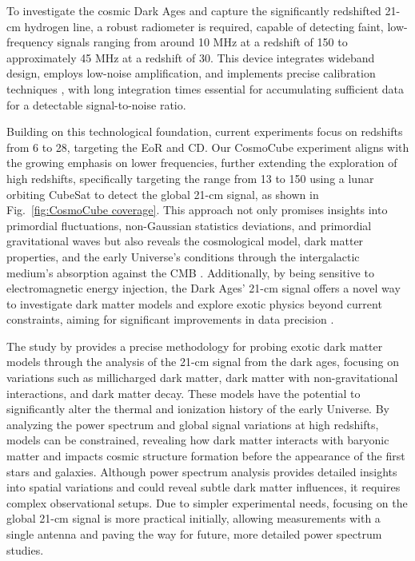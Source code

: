 \documentclass[fleqn,usenatbib]{rasti}
\begin{document}
To investigate the cosmic Dark Ages and capture the significantly redshifted 21-cm hydrogen line, a robust radiometer is required, capable of detecting faint, low-frequency signals ranging from around 10 MHz at a redshift of 150 to approximately 45 MHz at a redshift of 30. This device integrates wideband design, employs low-noise amplification, and implements precise calibration techniques \citep{Rogers2008}, with long integration times essential for accumulating sufficient data for a detectable signal-to-noise ratio. 

Building on this technological foundation, current experiments focus on redshifts from 6 to 28, targeting the EoR and CD. Our CosmoCube experiment aligns with the growing emphasis on lower frequencies, further extending the exploration of high redshifts, specifically targeting the range from 13 to 150 using a lunar orbiting CubeSat to detect the global 21-cm signal, as shown in Fig.~\ref{fig:CosmoCube coverage}. This approach not only promises insights into primordial fluctuations, non-Gaussian statistics deviations, and primordial gravitational waves but also reveals the cosmological model, dark matter properties, and the early Universe's conditions through the intergalactic medium's absorption against the CMB \citep{Pritchard2012}. Additionally, by being sensitive to electromagnetic energy injection, the Dark Ages' 21-cm signal offers a novel way to investigate dark matter models and explore exotic physics beyond current constraints, aiming for significant improvements in data precision \cite{Koopmans2021}.

The study by \cite{Mondal2023} provides a precise methodology for probing exotic dark matter models through the analysis of the 21-cm signal from the dark ages, focusing on variations such as millicharged dark matter, dark matter with non-gravitational interactions, and dark matter decay. These models have the potential to significantly alter the thermal and ionization history of the early Universe. By analyzing the power spectrum and global signal variations at high redshifts, models can be constrained, revealing how dark matter interacts with baryonic matter and impacts cosmic structure formation before the appearance of the first stars and galaxies. Although power spectrum analysis provides detailed insights into spatial variations and could reveal subtle dark matter influences, it requires complex observational setups. Due to simpler experimental needs, focusing on the global 21-cm signal is more practical initially, allowing measurements with a single antenna and paving the way for future, more detailed power spectrum studies.
\end{document}
